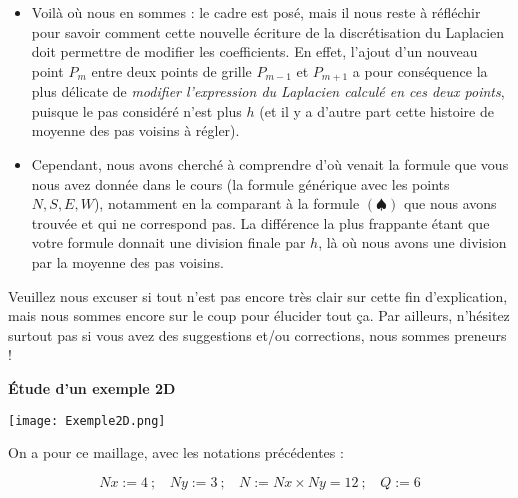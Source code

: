 \documentclass[12pt]{article}
\begin{document}
\noindent
\begin{itemize}
	\item Voilà où nous en sommes : le cadre est posé, mais il nous reste à réfléchir pour savoir comment cette nouvelle écriture de la discrétisation du Laplacien doit permettre de modifier les coefficients. En effet, l'ajout d'un nouveau point $P_m$ entre deux points de grille $P_{m-1}$ et $P_{m+1}$ a pour conséquence la plus délicate de \textit{modifier l'expression du Laplacien calculé en ces deux points}, puisque le pas considéré n'est plus $h$ (et il y a d'autre part cette histoire de moyenne des pas voisins à régler).
	
\vspace{5 mm}

	\item Cependant, nous avons cherché à comprendre d'où venait la formule que vous nous avez donnée dans le cours (la formule générique avec les points $N,S,E,W$), notamment en la comparant à la formule $(\spadesuit)$ que nous avons trouvée et qui ne correspond pas. La différence la plus frappante étant que votre formule donnait une division finale par $h$, là où nous avons une division par la moyenne des pas voisins.
\end{itemize}

\vspace{5 mm}

\noindent
Veuillez nous excuser si tout n'est pas encore très clair sur cette fin d'explication, mais nous sommes encore sur le coup pour élucider tout ça. Par ailleurs, n'hésitez surtout pas si vous avez des suggestions et/ou corrections, nous sommes preneurs !

\newpage


\vspace{5 mm}

\noindent
\begin{center}
\textbf{\large Étude d'un exemple 2D}
\end{center}

\vspace{5 mm}

\begin{center}
\texttt{[image: Exemple2D.png]}
\end{center}

\vspace{5 mm}

\noindent
On a pour ce maillage, avec les notations précédentes :

$$Nx := 4~;~~~~Ny := 3~;~~~~N := Nx \times Ny = 12~;~~~~Q := 6$$
\end{document}
